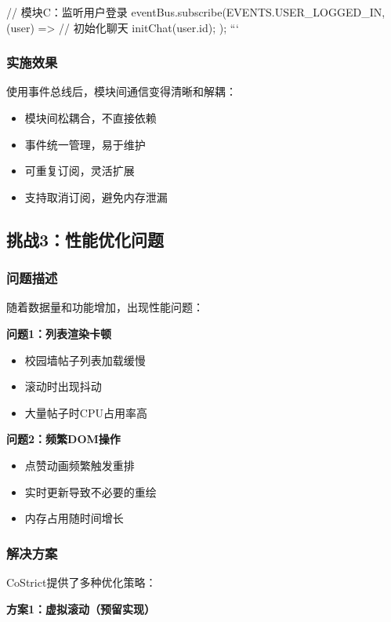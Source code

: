 \documentclass[12pt,a4paper]{article}
\begin{document}
// 模块C：监听用户登录
eventBus.subscribe(EVENTS.USER_LOGGED_IN, (user) => {
  // 初始化聊天
  initChat(user.id);
});
```

\subsubsection{实施效果}

使用事件总线后，模块间通信变得清晰和解耦：

\begin{itemize}
    \item 模块间松耦合，不直接依赖
    \item 事件统一管理，易于维护
    \item 可重复订阅，灵活扩展
    \item 支持取消订阅，避免内存泄漏
\end{itemize}

\subsection{挑战3：性能优化问题}

\subsubsection{问题描述}

随着数据量和功能增加，出现性能问题：

\textbf{问题1：列表渲染卡顿}
\begin{itemize}
    \item 校园墙帖子列表加载缓慢
    \item 滚动时出现抖动
    \item 大量帖子时CPU占用率高
\end{itemize}

\textbf{问题2：频繁DOM操作}
\begin{itemize}
    \item 点赞动画频繁触发重排
    \item 实时更新导致不必要的重绘
    \item 内存占用随时间增长
\end{itemize}

\subsubsection{解决方案}

CoStrict提供了多种优化策略：

\textbf{方案1：虚拟滚动（预留实现）}
\end{document}

